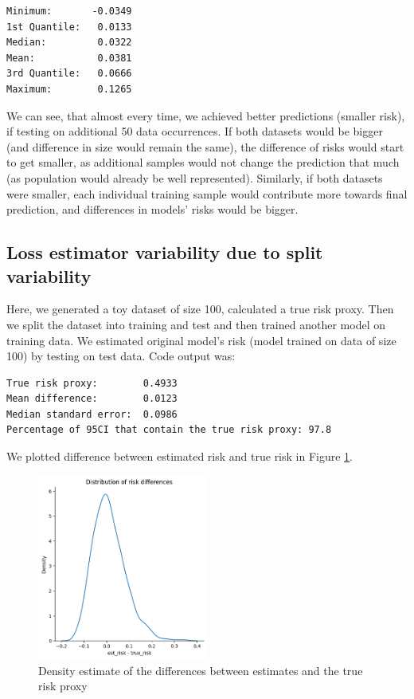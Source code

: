 \documentclass{article}
\begin{document}
\begin{lstlisting}[basicstyle=\small\ttfamily]
Minimum:       -0.0349
1st Quantile:   0.0133
Median:         0.0322      
Mean:           0.0381        
3rd Quantile:   0.0666
Maximum:        0.1265  
\end{lstlisting}

We can see, that almost every time, we achieved better predictions (smaller risk), if testing on additional 50 data occurrences. If both datasets would be bigger (and difference in size would remain the same), the difference of risks would start to get smaller, as additional samples would not change the prediction that much (as population would already be well represented). Similarly, if both datasets were smaller, each individual training sample would contribute more towards final prediction, and differences in models' risks would be bigger.

\subsection{Loss estimator variability due to split variability}

Here, we generated a toy dataset of size 100, calculated a true risk proxy. Then we split the dataset into training and test and then trained another model on training data. We estimated original model's risk (model trained on data of size 100) by testing on test data. Code output was:

\begin{lstlisting}[basicstyle=\small\ttfamily]
True risk proxy:        0.4933
Mean difference:        0.0123
Median standard error:  0.0986
Percentage of 95CI that contain the true risk proxy: 97.8
\end{lstlisting}

We plotted difference between estimated risk and true risk in Figure \ref{fig:risk_differences_2}.

\begin{figure}
    \centering
    \includegraphics[width=0.5\textwidth]{homework-02/plots/risk_differences_2.png}
    \caption{Density estimate of the differences between estimates and the true risk proxy}
    \label{fig:risk_differences_2}
\end{figure}
\end{document}
